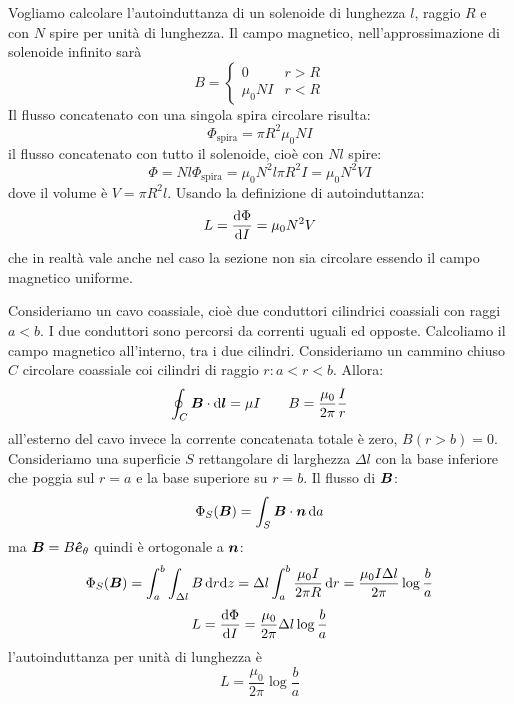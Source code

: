 \begin{Es}
  Vogliamo calcolare l'autoinduttanza di un solenoide di lunghezza $l$, raggio $R$ e con $N$ spire per unità di lunghezza. Il campo magnetico, nell'approssimazione di solenoide infinito sarà
  \begin{equation}
    B=
    \left\{
    \begin{array}{ll}
      0       & r>R \\
      \mu_0NI & r<R
    \end{array}
    \right.
  \end{equation}
  Il flusso concatenato con una singola spira circolare risulta:
  \begin{equation}
    \Phi_\text{spira}=\pi R^2\mu_0NI
  \end{equation}
  il flusso concatenato con tutto il solenoide, cioè con $Nl$ spire:
  \begin{equation}
    \Phi=Nl\Phi_\text{spira}=\mu_0N^2l\pi R^2 I=\mu_0 N^2 V I
  \end{equation}
  dove il volume è $V=\pi R^2 l$. Usando la definizione di autoinduttanza:
  \begin{equation}
    L=\frac{\mathrm{d}\Phi}{\mathrm{d} I}=\mu_0 N^2 V
  \end{equation}
  che in realtà vale anche nel caso la sezione non sia circolare essendo il campo magnetico uniforme.
\end{Es}
\begin{Es}
  Consideriamo un cavo coassiale, cioè due conduttori cilindrici coassiali con raggi $a<b$. I due conduttori sono percorsi da correnti uguali ed opposte. Calcoliamo il campo magnetico all'interno, tra i due cilindri. Consideriamo un cammino chiuso $C$ circolare coassiale coi cilindri di raggio $r:a<r<b$. Allora:
  \begin{equation}
    \oint_C\boldsymbol{B}\cdot\mathrm{d}\boldsymbol{l}=\mu I\qquad B=\frac{\mu_0}{2\pi}\frac{I}{r}
  \end{equation}
  all'esterno del cavo invece la corrente concatenata totale è zero, $B(r>b)=0$. Consideriamo una superficie $S$ rettangolare di larghezza $\Delta l$ con la base inferiore che poggia sul $r=a$ e la base superiore su $r=b$. Il flusso di $\boldsymbol{B}$:
  \begin{equation}
    \Phi_S(\boldsymbol{B})=\int_S \boldsymbol{B}\cdot\boldsymbol{n}\,\mathrm{d} a
  \end{equation}
  ma $\boldsymbol{B}=B\boldsymbol{\hat {e}}_\theta$ quindi è ortogonale a $\boldsymbol{n}$:
  \begin{equation}
    \Phi_S(\boldsymbol{B})=\int_{a}^{b}\int_{\Delta l} B\,\mathrm{d} r\mathrm{d} z=\Delta l\int_a^b\frac{\mu_0I}{2\pi R}\,\mathrm{d} r=\frac{\mu_0I\Delta l}{2\pi}\log\frac{b}{a}
  \end{equation}
  \begin{equation}
    L=\frac{\mathrm{d}\Phi}{\mathrm{d} I}=\frac{\mu_0}{2\pi}\Delta l\log\frac{b}{a}
  \end{equation}
  l'autoinduttanza per unità di lunghezza è
  \begin{equation}
    L=\frac{\mu_0}{2\pi}\log\frac{b}{a}
  \end{equation}
\end{Es}
